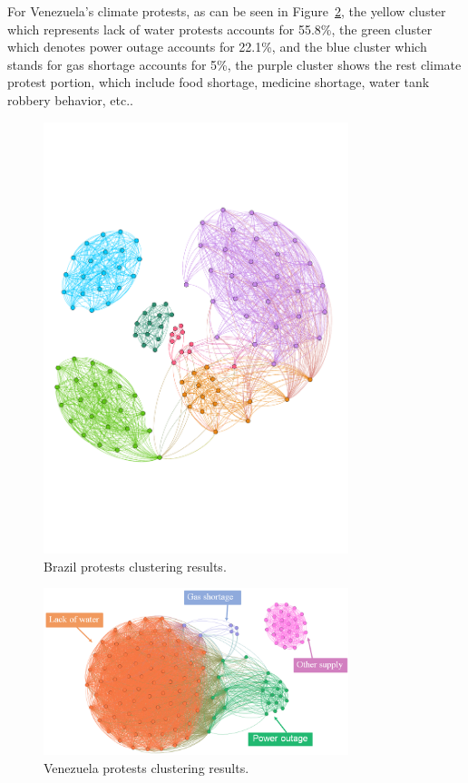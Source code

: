 \documentclass[9pt,twocolumn,twoside]{pnas-new}
\begin{document}
For Venezuela's climate protests, as can be seen in Figure~\ref{Venezuela-cluster}, the yellow cluster which represents lack of water protests accounts for 55.8\%, the green cluster which denotes power outage accounts for 22.1\%, and the blue cluster which stands for gas shortage accounts for 5\%, the purple cluster shows the rest climate protest portion, which include food shortage, medicine shortage, water tank robbery behavior, etc..


\begin{figure}[ht]
\centerline
{\includegraphics[width = 3.5in]{figures/Brazil_cluster}}
\caption{Brazil protests clustering results.}
\label{Brazil-cluster}
\end{figure}

\begin{figure}[ht]
\centerline
{\includegraphics[width = 3.5in]{figures/venezuela-cluster2}}
\caption{Venezuela protests clustering results.}
\label{Venezuela-cluster}
\end{figure}
\end{document}
